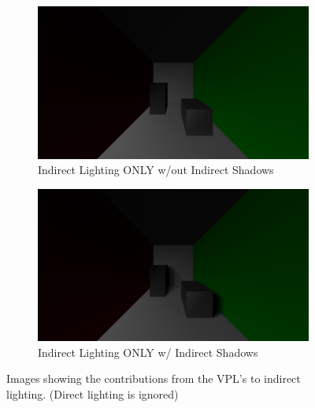 \begin{figure}
        \centering
        \begin{subfigure}[b]{1.0\textwidth}
                \includegraphics[width=\textwidth]{indirect_only.jpg}
                \caption{Indirect Lighting ONLY w/out Indirect Shadows}
                \label{fig:indirectonly}
        \end{subfigure}
        \begin{subfigure}[b]{1.0\textwidth}
                \includegraphics[width=\textwidth]{indirect_only_shadows.jpg}
                \caption{Indirect Lighting ONLY w/ Indirect Shadows}
                \label{fig:indirectonlyshadows}
        \end{subfigure}
        \caption{Images showing the contributions from the VPL's to indirect lighting. (Direct lighting is ignored)}\label{fig:indirect}
\end{figure}


